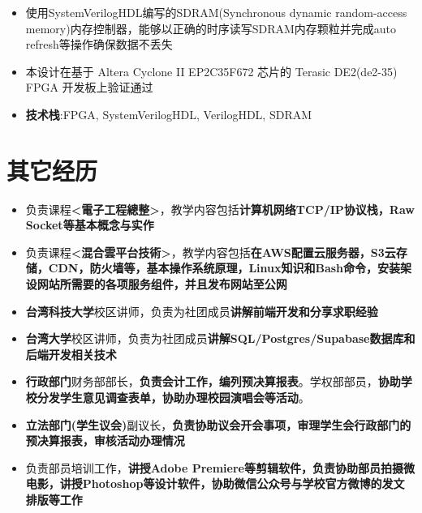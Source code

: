 \documentclass{resume}
\begin{document}
        \begin{itemize}
            \item 使用SystemVerilogHDL编写的SDRAM(Synchronous dynamic random-access memory)内存控制器，能够以正确的时序读写SDRAM内存颗粒并完成auto refresh等操作确保数据不丢失
            \item 本设计在基于 Altera Cyclone II EP2C35F672 芯片的 Terasic DE2(de2-35) FPGA 开发板上验证通过
            \item \textbf{技术栈}:FPGA, SystemVerilogHDL, VerilogHDL, SDRAM
        \end{itemize}

\section{ 其它经历}
        \begin{itemize}
            \item 负责课程\textbf{<電子工程總整>}，教学内容包括\textbf{计算机网络TCP/IP协议栈，Raw Socket等基本概念与实作}
            \item 负责课程\textbf{<混合雲平台技術>}，教学内容包括\textbf{在AWS配置云服务器，S3云存储，CDN，防火墙等，基本操作系统原理，Linux知识和Bash命令，安装架设网站所需要的各项服务组件，并且发布网站至公网}
        \end{itemize}
        \begin{itemize}
            \item \textbf{台湾科技大学}校区讲师，负责为社团成员\textbf{讲解前端开发和分享求职经验}
            \item \textbf{台湾大学}校区讲师，负责为社团成员\textbf{讲解SQL/Postgres/Supabase数据库和后端开发相关技术}
        \end{itemize}
        \begin{itemize}
            \item \textbf{行政部门}财务部部长，\textbf{负责会计工作，编列预决算报表}。学权部部员，\textbf{协助学校分发学生意见调查表单，协助办理校园演唱会等活动}。
            \item \textbf{立法部门(学生议会)}副议长，\textbf{负责协助议会开会事项，审理学生会行政部门的预决算报表，审核活动办理情况}
        \end{itemize}
        \begin{itemize}
            \item 负责部员培训工作，\textbf{讲授Adobe Premiere等剪辑软件，负责协助部员拍摄微电影，讲授Photoshop等设计软件，协助微信公众号与学校官方微博的发文排版等工作}
        \end{itemize}
\end{document}
